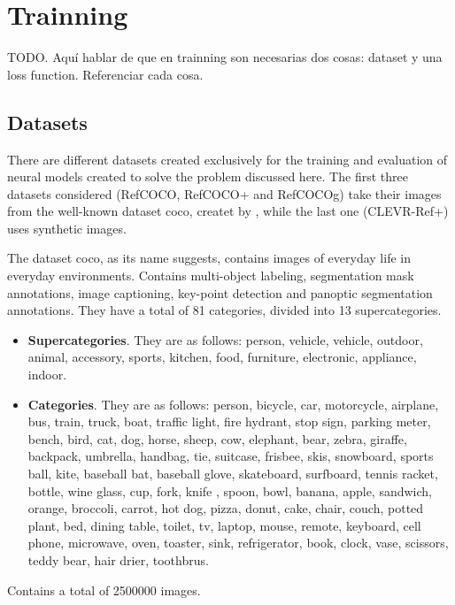 \section{Trainning}

TODO. Aquí hablar de que en trainning son necesarias dos cosas: dataset y una
loss function. Referenciar cada cosa.

\subsection{Datasets}\label{sec:datasets}

There are different datasets created exclusively for the training and
evaluation of neural models created to solve the problem discussed here. The
first three datasets considered (RefCOCO, RefCOCO+ and RefCOCOg) take their
images from the well-known dataset \gls{coco}, createt by
, while the last one (CLEVR-Ref+) uses synthetic images.

The dataset \gls{coco}, as its name suggests, contains images of everyday life
in everyday environments. Contains multi-object labeling, segmentation mask
annotations, image captioning, key-point detection and panoptic segmentation
annotations. They have a total of 81 categories, divided into 13
supercategories.
\begin{itemize}
  \item \textbf{Supercategories}. They are as follows: person, vehicle,
  vehicle, outdoor, animal, accessory, sports, kitchen, food, furniture,
  electronic, appliance, indoor.
  \item \textbf{Categories}. They are as follows: person, bicycle, car,
  motorcycle, airplane, bus, train, truck, boat, traffic light, fire hydrant,
  stop sign, parking meter, bench, bird, cat, dog, horse, sheep, cow, elephant,
  bear, zebra, giraffe, backpack, umbrella, handbag, tie, suitcase, frisbee,
  skis, snowboard, sports ball, kite, baseball bat, baseball glove, skateboard,
  surfboard, tennis racket, bottle, wine glass, cup, fork, knife , spoon, bowl,
  banana, apple, sandwich, orange, broccoli, carrot, hot dog, pizza, donut,
  cake, chair, couch, potted plant, bed, dining table, toilet, tv, laptop,
  mouse, remote, keyboard, cell phone, microwave, oven, toaster, sink,
  refrigerator, book, clock, vase, scissors, teddy bear, hair drier, toothbrus.
\end{itemize}
Contains a total of \num{2500000} images.

